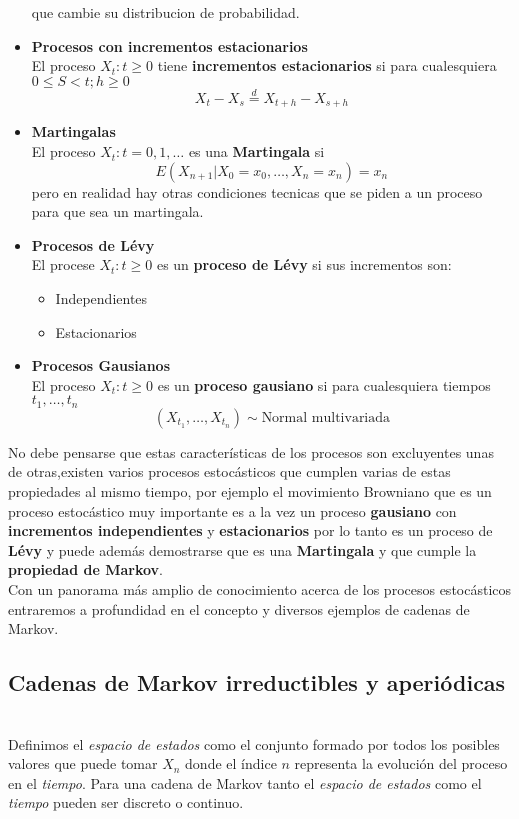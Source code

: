 \documentclass[10pt,a4paper]{article}
\theoremstyle{definition}
\theoremstyle{remark}
\begin{document}
\begin{multicols}{2}
\begin{itemize}
	que cambie su distribucion de probabilidad.\\
	\item \textbf{Procesos con incrementos estacionarios}\\
	El proceso ${X_t : t \geq 0}$ tiene \textbf{incrementos estacionarios} si para 
	cualesquiera $0\leq S < t; h \geq 0 $ $$X_t - X_s \stackrel{d}{=} X_{t+h} - X_{s+h} 
	$$
	\item \textbf{Martingalas} \\
	El proceso ${X_t : t = 0,1,\dots}$ es una \textbf{Martingala} si $$E(X_{n+1}|
	X_0=x_0,\dots,X_n=x_n)=x_n$$ pero en realidad hay otras condiciones tecnicas que se 
	piden a un proceso para que sea un martingala.\\
	\item \textbf{Procesos de Lévy} \\
	El procese ${X_t: t\geq0}$ es un \textbf{proceso de Lévy} si sus incrementos son:
	\begin{itemize}
		\item Independientes
		\item Estacionarios
	\end{itemize}
	\item \textbf{Procesos Gausianos}\\
	El proceso $X_t: t\geq 0$ es un \textbf{proceso gausiano} si para cualesquiera 
	tiempos $t_1,\dots,t_n$ 
	$$(X_{t_1},\dots,X_{t_n}) \sim \mbox{Normal multivariada}$$
\end{itemize}
\noindent No debe pensarse que estas características de los procesos son 
excluyentes unas de otras,existen varios procesos estocásticos que cumplen 
varias de estas propiedades al mismo tiempo, por ejemplo el movimiento Browniano que es un proceso estocástico muy importante es a la vez un proceso \textbf{gausiano} con \textbf{incrementos 
independientes} y \textbf{estacionarios} por lo tanto es un proceso de \textbf{Lévy} y 
puede además demostrarse que es una \textbf{Martingala} y que cumple la 
\textbf{propiedad de Markov}.\\

\noindent Con un panorama más amplio de conocimiento acerca de los procesos estocásticos entraremos a profundidad en el concepto y diversos ejemplos de cadenas de Markov.\\
\subsection{Cadenas de Markov irreductibles y aperiódicas}
\\
Definimos el \textit{espacio de estados} como el conjunto formado por todos los posibles 
valores que puede tomar $X_{n}$ donde el índice $n$ representa la evolución del proceso 
en el \textit{tiempo}. Para una cadena de Markov tanto el \textit{espacio de estados} 
como el \textit{tiempo} pueden ser discreto o continuo.\\


\end{multicols}
\end{document}
